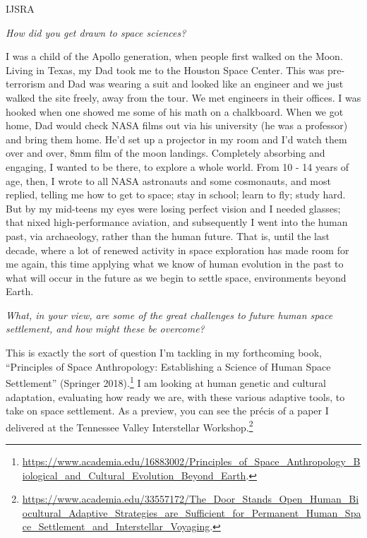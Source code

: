 \begin{labeling}{IJSRA}
	\item[IJSRA (International Journal of Student Research in Archaeology)] \emph{How did you get drawn to space sciences?}

	\item[Cameron M. Smith (CMS)] I was a child of the Apollo generation, when people first walked on the Moon. Living in Texas, my Dad took me to the Houston Space Center. This was pre-terrorism and Dad was wearing a suit and looked like an engineer and we just walked the site freely, away from the tour. We met engineers in their offices. I was hooked when one showed me some of his math on a chalkboard. When we got home, Dad would check NASA films out via his university (he was a professor) and bring them home. He'd set up a projector in my room and I'd watch them over and over, 8mm film of the moon landings. Completely absorbing and engaging, I wanted to be there, to explore a whole world. From 10 - 14 years of age, then, I wrote to all NASA astronauts and some cosmonauts, and most replied, telling me how to get to space; stay in school; learn to fly; study hard. But by my mid-teens my eyes were losing perfect vision and I needed glasses; that nixed high-performance aviation, and subsequently I went into the human past, via archaeology, rather than the human future. That is, until the last decade, where a lot of renewed activity in space exploration has made room for me again, this time applying what we know of human evolution in the past to what will occur in the future as we begin to settle space, environments beyond Earth.

	\item[IJSRA] \emph{What, in your view, are some of the great challenges to future human space settlement, and how might these be overcome?}

	\item[CMS] This is exactly the sort of question I'm tackling in my forthcoming book, “Principles of Space Anthropology: Establishing a Science of Human Space Settlement” (Springer 2018).\footnote{\url{https://www.academia.edu/16883002/Principles_of_Space_Anthropology_Biological_and_Cultural_Evolution_Beyond_Earth}.} I am looking at human genetic and cultural adaptation, evaluating how ready we are, with these various adaptive tools, to take on space settlement. As a preview, you can see the précis of a paper I delivered at the Tennessee Valley Interstellar Workshop.\footnote{\url{https://www.academia.edu/33557172/The_Door_Stands_Open_Human_Biocultural_Adaptive_Strategies_are_Sufficient_for_Permanent_Human_Space_Settlement_and_Interstellar_Voyaging}.}


\end{labeling}
